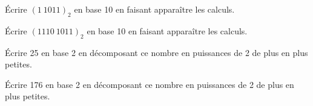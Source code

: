 \documentclass[a4paper,12pt,eval,firamath]{nsi}
\begin{document}
\maketitle

\'Ecrire $(1\ 1011)_2$ en base 10 en faisant apparaître les calculs.\\


\'Ecrire $(1110\ 1011)_2$ en base 10 en faisant apparaître les calculs.\\


\'Ecrire 25 en base 2 en décomposant ce nombre en puissances de 2 de plus en plus petites.\\


\'Ecrire 176 en base 2 en décomposant ce nombre en puissances de 2 de plus en plus petites.\\

\end{document}
